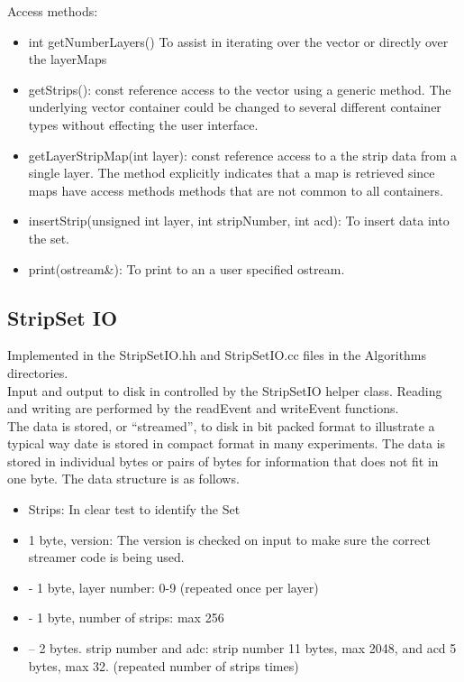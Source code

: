 \documentclass[aps,prd,superscriptaddress,floatfix]{revtex4}
\begin{document}
Access methods:
\begin{itemize}
\item int getNumberLayers() To assist in iterating over the vector or directly over the layerMaps
\item getStrips(): const reference access to the vector using a generic method. The underlying vector container could be 
changed to several different container types without effecting the user interface.
\item getLayerStripMap(int layer): const reference access to a the strip data from a single layer. The method explicitly 
indicates that a map is retrieved since maps have access methods methods that are not common to all containers.
\item insertStrip(unsigned int layer, int stripNumber, int acd):  To insert data into the set.
\item print(ostream\&): To print to an a user specified ostream.
\end{itemize}

\subsection{StripSet IO}
Implemented in the StripSetIO.hh and StripSetIO.cc files in the Algorithms directories.
\\

Input and output to disk in controlled by the StripSetIO helper class.  Reading and writing
are performed by the readEvent and writeEvent functions.
\\

The data is stored, or ``streamed'', to disk in bit packed format to illustrate a typical way date is stored in compact
format in many experiments.  The data is stored in individual bytes or pairs of bytes for information
that does not fit in one byte.  The data structure is as follows.
\begin{itemize}
\item Strips: In clear test to identify the Set
\item  1 byte, version: The version is checked on input to make sure the correct streamer code is being used.
\item - 1 byte, layer number: 0-9 (repeated once per layer)
\item - 1 byte, number of strips: max 256
\item -- 2 bytes. strip number and adc: strip number 11 bytes, max 2048, and acd 5 bytes, max 32. (repeated number of strips times)
\end{itemize}
\end{document}
